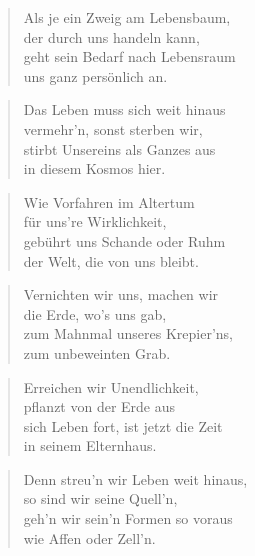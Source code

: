 \documentclass[10pt,a4paper]{article}
\begin{document}
\begin{multicols}{2}
\begin{verse}
Als je ein Zweig am Lebensbaum, \\
der durch uns handeln kann, \\
geht sein Bedarf nach Lebensraum \\
uns ganz persönlich an. \\
\end{verse}

\begin{verse}
Das Leben muss sich weit hinaus \\
vermehr’n, sonst sterben wir, \\
stirbt Unsereins als Ganzes aus \\
in diesem Kosmos hier. \\
\end{verse}

\begin{verse}
Wie Vorfahren im Altertum \\
für uns’re Wirklichkeit, \\
gebührt uns Schande oder Ruhm \\
der Welt, die von uns bleibt. \\
\end{verse}

\begin{verse}
Vernichten wir uns, machen wir \\
die Erde, wo’s uns gab, \\
zum Mahnmal unseres Krepier’ns, \\
zum unbeweinten Grab. \\
\end{verse}

\begin{verse}
Erreichen wir Unendlichkeit, \\
pflanzt von der Erde aus \\
sich Leben fort, ist jetzt die Zeit \\
in seinem Elternhaus. \\
\end{verse}

\begin{verse}
Denn streu’n wir Leben weit hinaus, \\
so sind wir seine Quell’n, \\
geh’n wir sein’n Formen so voraus \\
wie Affen oder Zell’n. \\
\end{verse}


\end{multicols}
\end{document}

